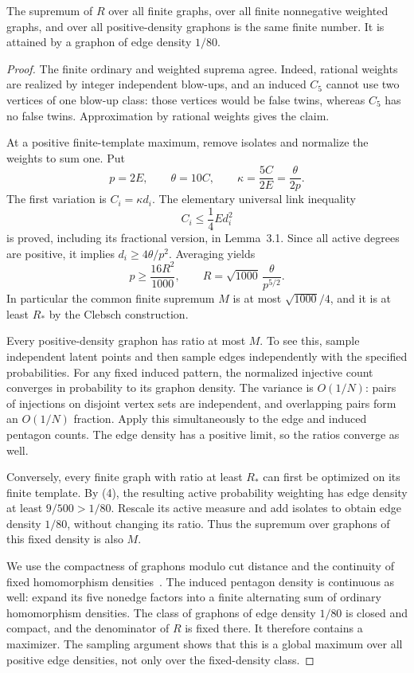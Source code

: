 \begin{lemma}\label{lem:global-maximum}
The supremum of \(R\) over all finite graphs, over all finite nonnegative
weighted graphs, and over all positive-density graphons is the same finite
number. It is attained by a graphon of edge density \(1/80\).
\end{lemma}
\begin{proof}
The finite ordinary and weighted suprema agree. Indeed, rational weights
are realized by integer independent blow-ups, and an induced \(C_5\)
cannot use two vertices of one blow-up class: those vertices would be
false twins, whereas \(C_5\) has no false twins. Approximation by rational
weights gives the claim.

At a positive finite-template maximum, remove isolates and normalize the
weights to sum one. Put
\[
 p=2E,\qquad \theta=10C,\qquad
 \kappa=\frac{5C}{2E}=\frac{\theta}{2p}.
\]
The first variation is \(C_i=\kappa d_i\). The elementary universal link
inequality
\begin{equation}
 C_i\le\frac14Ed_i^2\tag{3}
\end{equation}
is proved, including its fractional version, in Lemma~3.1. Since all
active degrees are positive, it implies \(d_i\ge4\theta/p^2\). Averaging
yields
\begin{equation}
 p\ge\frac{16R^2}{1000},\qquad
 R=\sqrt{1000}\,\frac{\theta}{p^{5/2}}.\tag{4}
\end{equation}
In particular the common finite supremum \(M\) is at most
\(\sqrt{1000}/4\), and it is at least \(R_*\) by the Clebsch construction.

Every positive-density graphon has ratio at most \(M\). To see this,
sample independent latent points and then sample edges independently with
the specified probabilities. For any fixed induced pattern, the normalized
injective count converges in probability to its graphon density. The
variance is \(O(1/N)\): pairs of injections on disjoint vertex sets are
independent, and overlapping pairs form an \(O(1/N)\) fraction. Apply this
simultaneously to the edge and induced pentagon counts. The edge density
has a positive limit, so the ratios converge as well.

Conversely, every finite graph with ratio at least \(R_*\) can first be
optimized on its finite template. By (4), the resulting active probability
weighting has edge density at least \(9/500>1/80\). Rescale its active
measure and add isolates to obtain edge density \(1/80\), without changing
its ratio. Thus the supremum over graphons of this fixed density is also
\(M\).

We use the compactness of graphons modulo cut distance
\cite[Theorem~5.1]{LovaszSzegedy2007} and the continuity of fixed
homomorphism densities~\cite{LovaszSzegedy2006}. The induced pentagon
density is continuous as well: expand its five nonedge factors into a
finite alternating sum of ordinary homomorphism densities. The class of
graphons of edge density \(1/80\) is closed and compact, and the
denominator of \(R\) is fixed there. It therefore contains a maximizer.
The sampling argument shows that this is a global maximum over all
positive edge densities, not only over the fixed-density class.
\end{proof}

